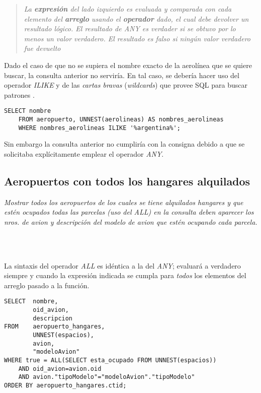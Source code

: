\begin{quote}\itshape
    La \textbf{expresión} del lado izquierdo es evaluada y comparada con cada elemento del \textbf{arreglo} usando el \textbf{operador} dado, el cual debe devolver un resultado lógico. El resultado de \emph{ANY} es verdader si se obtuvo por lo menos un valor verdadero. El resultado es falso si ningún valor verdadero fue devuelto \cite{any}    
\end{quote}

Dado el caso de que no se supiera el nombre exacto de la aerolínea que se quiere buscar, la consulta anterior no serviría. En tal caso, se debería hacer uso del operador \emph{ILIKE} y de las \emph{cartas bravas} (\emph{wildcards}) que provee SQL para buscar patrones \cite{pattern}.

\vspace*{5mm}
\lstset{style=sql}
\begin{lstlisting}
SELECT nombre
    FROM aeropuerto, UNNEST(aerolineas) AS nombres_aerolineas 
    WHERE nombres_aerolineas ILIKE '%argentina%';
\end{lstlisting}

Sin embargo la consulta anterior no cumpliría con la consigna debido a que se solicitaba explícitamente emplear el operador \emph{ANY}.

\subsection{Aeropuertos con todos los hangares alquilados}

\emph{Mostrar todos los aeropuertos de los cuales se tiene alquilados hangares y que estén ocupados todas las parcelas (uso del ALL) en la consulta deben aparecer los nros. de avion y descripción del modelo de avion que estén ocupando cada parcela.} 

\\~

La sintaxis del operador \emph{ALL} es idéntica a la del \emph{ANY}; evaluará a verdadero siempre y cuando la expresión indicada se cumpla para \emph{todos} los elementos del arreglo pasado a la función.   

\vspace*{5mm}
\lstset{style=sql}
\begin{lstlisting}
SELECT  nombre, 
        oid_avion, 
        descripcion 
FROM    aeropuerto_hangares, 
        UNNEST(espacios), 
        avion, 
        "modeloAvion" 
WHERE true = ALL(SELECT esta_ocupado FROM UNNEST(espacios)) 
    AND oid_avion=avion.oid 
    AND avion."tipoModelo"="modeloAvion"."tipoModelo" 
ORDER BY aeropuerto_hangares.ctid;
\end{lstlisting}

